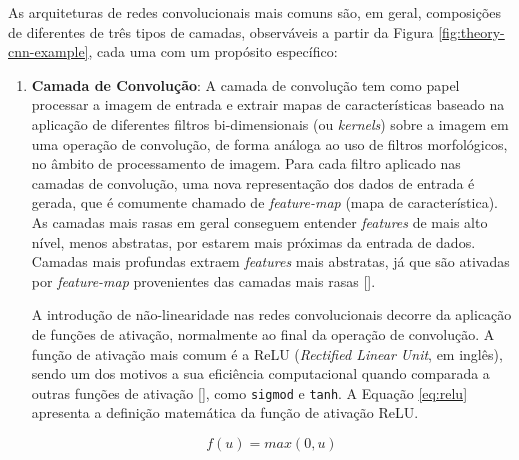 As arquiteturas de redes convolucionais mais comuns são, em geral, composições de diferentes de três tipos de camadas, observáveis a partir da Figura \ref{fig:theory-cnn-example}, cada uma com um propósito específico:
\begin{enumerate}
    \item \textbf{Camada de Convolução}:
            A camada de convolução tem como papel processar a imagem de entrada e extrair mapas de características baseado na aplicação de diferentes filtros bi-dimensionais (ou \textit{kernels}) sobre a imagem em uma operação de convolução, de forma análoga ao uso de filtros morfológicos, no âmbito de processamento de imagem. Para cada filtro aplicado nas camadas de convolução, uma nova representação dos dados de entrada é gerada, que é comumente chamado de \textit{feature-map} (mapa de característica). As camadas mais rasas em geral conseguem entender \textit{features} de mais alto nível, menos abstratas, por estarem mais próximas da entrada de dados. Camadas mais profundas extraem \textit{features} mais abstratas, já que são ativadas por \textit{feature-map} provenientes das camadas mais rasas [].
        
            A introdução de não-linearidade nas redes convolucionais decorre da aplicação de funções de ativação, normalmente ao final da operação de convolução. A função de ativação mais comum é a ReLU (\textit{Rectified Linear Unit}, em inglês), sendo um dos motivos a sua eficiência computacional quando comparada a outras funções de ativação [], como \texttt{sigmod} e \texttt{tanh}. A Equação \ref{eq:relu} apresenta a definição matemática da função de ativação ReLU.
            
            \begin{equation}
                f(u) = max(0,u)
                \label{eq:relu}
            \end{equation}
            

\end{enumerate}
